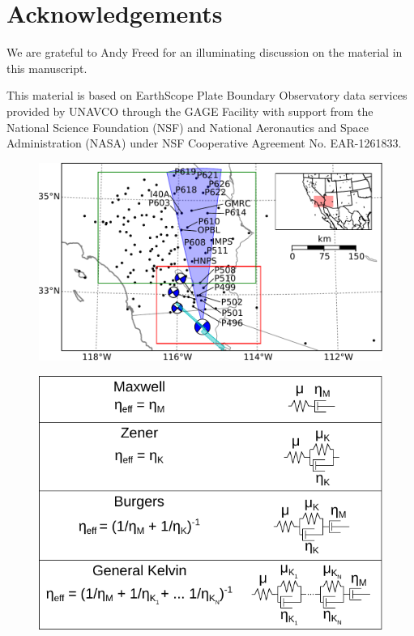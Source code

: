 \documentclass[12pt]{article}
\begin{document}
\section*{Acknowledgements}
We are grateful to Andy Freed for an illuminating discussion on the material in this manuscript.  
 
This material is based on EarthScope Plate Boundary Observatory data services provided by UNAVCO through the GAGE Facility with support from the National Science Foundation (NSF) and National Aeronautics and Space Administration (NASA) under NSF Cooperative Agreement No. EAR-1261833.




\begin{figure}
\includegraphics[scale=0.9]{Figures/context_map}
\centering 
\caption{}
\label{fig:ContextMap}
\end{figure}

\begin{figure}
\includegraphics[scale=0.9]{Figures/rheology}
\centering 
\caption{}
\label{fig:Rheology}
\end{figure}
\end{document}
